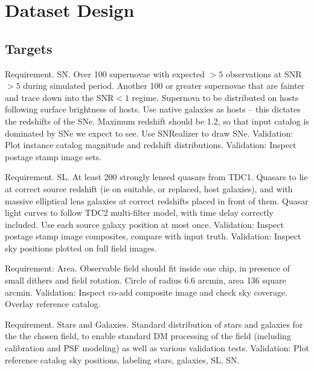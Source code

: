 \section{Dataset Design}
\label{sec:twinkles1:design}



\subsection{Targets}

Requirement. SN. 
Over 100 supernovae with expected $>5$ observations at SNR$>5$ during simulated period.
Another 100 or greater supernovae that are fainter and trace down into the SNR$<1$ regime.
Supernova to be distributed on hosts following surface brightness of hosts. Use native \CatSim
galaxies as hosts -- this dictates the redshifts of the SNe. Maximum redshift should be 1.2, so that input catalog is dominated by SNe we expect to see. Use SNRealizer to draw SNe.
Validation: Plot instance catalog magnitude and redshift distributions.
Validation: Inspect postage stamp image sets. 

Requirement. SL.
At least 200 strongly lensed quasars from TDC1. Quasars to lie at correct source redshift (ie on suitable, or replaced, \CatSim host galaxies), and with massive elliptical 
lens galaxies at correct redshifts placed in front of them. Quasar light curves to follow TDC2 multi-filter model, with time delay correctly included. Use each source galaxy position at most once. 
Validation: Inspect postage stamp image composites, compare with input truth.
Validation: Inspect sky positions plotted on full field images. 

Requirement: Area. 
Observable field should fit inside one chip, in presence of small dithers and field rotation. Circle of radius 6.6 arcmin, area 136 square arcmin. 
Validation: Inspect co-add composite image and check sky coverage. Overlay \CatSim reference catalog. 

Requirement. Stars and Galaxies.
Standard \CatSim distribution of stars and galaxies for the the chosen field, to enable standard DM processing of the field (including calibration and PSF modeling) as well as various validation tests. 
Validation: Plot \CatSim reference catalog sky positions, labeling stars, galaxies, SL, SN. 

